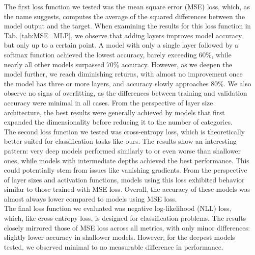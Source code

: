 The first loss function we tested was the mean square error (MSE) loss, which, as the name suggests, computes the average of the squared differences between the model output and the target. When examining the results for this loss function in Tab. \ref{tab:MSE_MLP}, we observe that adding layers improves model accuracy but only up to a certain point. A model with only a single layer followed by a softmax function achieved the lowest accuracy, barely exceeding 60\%, while nearly all other models surpassed 70\% accuracy. However, as we deepen the model further, we reach diminishing returns, with almost no improvement once the model has three or more layers, and accuracy slowly approaches 80\%. We also observe no signs of overfitting, as the differences between training and validation accuracy were minimal in all cases. From the perspective of layer size architecture, the best results were generally achieved by models that first expanded the dimensionality before reducing it to the number of categories.
\\

The second loss function we tested was cross-entropy loss, which is theoretically better suited for classification tasks like ours. The results show an interesting pattern: very deep models performed similarly to or even worse than shallower ones, while models with intermediate depths achieved the best performance. This could potentially stem from issues like vanishing gradients. From the perspective of layer sizes and activation functions, models using this loss exhibited behavior similar to those trained with MSE loss. Overall, the accuracy of these models was almost always lower compared to models using MSE loss.
\\

The final loss function we evaluated was negative log-likelihood (NLL) loss, which, like cross-entropy loss, is designed for classification problems. The results closely mirrored those of MSE loss across all metrics, with only minor differences: slightly lower accuracy in shallower models. However, for the deepest models tested, we observed minimal to no measurable difference in performance.
\\

